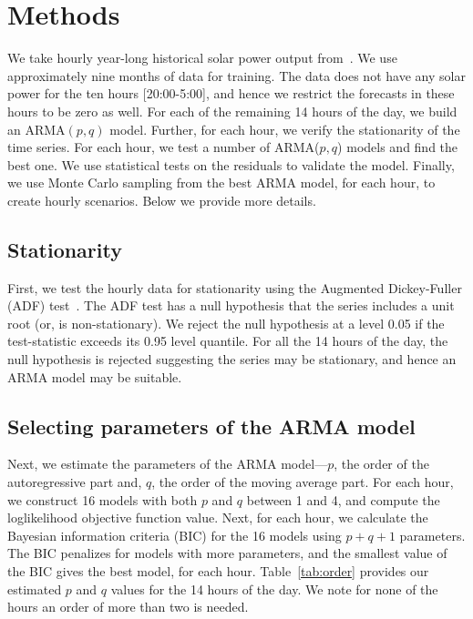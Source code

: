 \documentclass[review]{elsarticle}
\begin{document}
\section{Methods}
We take hourly year-long historical solar power output 
from~\cite{golestaneh2016generation}. We use approximately nine months of data 
for training. The data does not have any solar power for the ten hours 
[20:00-5:00], and hence we restrict the forecasts in these hours to be zero as 
well. For each of the remaining 14 hours of the day, we build an ARMA$(p,q)$ 
model. Further, for each hour, we verify the stationarity of the time 
series. For each hour, we test a number of ARMA($p,q$) models and find the best 
one. We use statistical tests on the residuals to validate the model. Finally, 
we use Monte Carlo sampling from the best ARMA model, for each hour, to create 
hourly scenarios. Below we provide more details.

\subsection{Stationarity}
First, we test the hourly data for stationarity using the Augmented 
Dickey-Fuller (ADF) test~\cite{dickey1979distribution}. The ADF test has a null 
hypothesis that the series includes a unit root (or, is non-stationary). We 
reject the null hypothesis at a level 0.05 if the test-statistic exceeds its 
0.95 level quantile. For all the 14 hours of the day, the null hypothesis is 
rejected suggesting the series may be stationary, and hence an ARMA model may 
be suitable.

\subsection{Selecting parameters of the ARMA model}
Next, we estimate the parameters of the ARMA model---$p$, the order of the 
autoregressive part and, $q$, the order of the moving average part. For each 
hour, we construct 16 models with both $p$ and $q$ between 1 and 4, and compute 
the loglikelihood objective function value. Next, for each hour, we calculate 
the Bayesian information criteria (BIC) for the 16 models using $p + q + 1$ 
parameters.  The BIC penalizes for models with more parameters, and the 
smallest value of the BIC gives the best model, for each 
hour. Table~\ref{tab:order} provides our estimated $p$ and $q$  values for 
the 14 hours of the day. We note for none of the hours an order of more than 
two is needed. 
\end{document}
